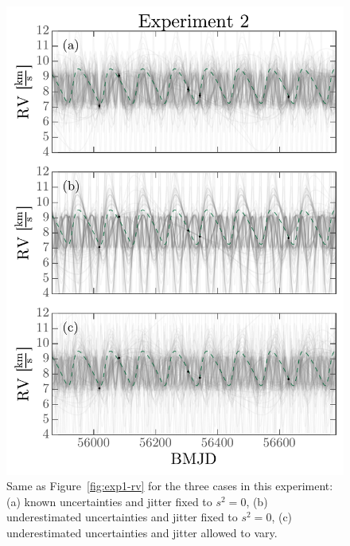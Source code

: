 \documentclass[manuscript, letterpaper]{aastex6}
\newcommand{\figname}{Figure}
\begin{document}
\begin{figure}[p]
\begin{center}
\includegraphics[width=\textwidth]{figures/exp2-rv-curves.pdf}
\end{center}
\caption{%
Same as \figname~\ref{fig:exp1-rv} for the three cases in this experiment:
(a) known uncertainties and jitter fixed to $s^2 = 0$, (b) underestimated
uncertainties and jitter fixed to $s^2 = 0$, (c) underestimated uncertainties
and jitter allowed to vary.
\label{fig:exp2-rv}}
\end{figure}
\end{document}
